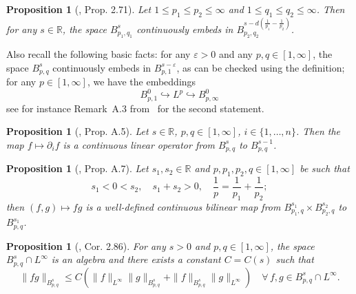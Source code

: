 \documentclass[11pt,oneside,reqno]{amsart}
\newtheorem{proposition}[theorem]{Proposition}
{\theoremstyle{remark}\newtheorem{remark}[theorem]{Remark}}
\numberwithin{equation}{section}
\begin{document}
\begin{proposition}[{\cite{bahouri}}, Prop. 2.71]
  \label{prop:besov-embeddings}Let $1 \leqslant p_1 \leqslant p_2 \leqslant
  \infty$ and $1 \leqslant q_1 \leqslant q_2 \leqslant \infty$. Then for any
  $s \in \mathbb{R}$, the space $B^s_{p_1, q_1}$ continuously embeds in $B^{s
  - d \left( \frac{1}{p_1} - \frac{1}{p_2} \right)}_{p_2, q_2}$.
\end{proposition}

Also recall the following basic facts: for any $\varepsilon > 0$ and any $p, q
\in [1, \infty]$, the space $B^s_{p, q}$ continuously embeds in $B^{s -
\varepsilon}_{p, 1}$, as can be checked using the definition; for any $p \in
[1, \infty]$, we have the embeddings
\[ B^{0}_{p, 1} \hookrightarrow L^p \hookrightarrow
   B^{0}_{p, \infty} \]
see for instance Remark~A.3 from~{\cite{mourrat}} for the second statement.

\begin{proposition}[{\cite{mourrat}}, Prop. A.5]
  \label{prop:besov-differentiation}Let $s \in \mathbb{R}$, $p, q \in [1,
  \infty]$, $i \in \{ 1, \ldots, n \}$. Then the map $f \mapsto \partial_i f$
  is a continuous linear operator from $B^s_{p, q}$ to $B^{s - 1}_{p, q}$.
\end{proposition}

\begin{proposition}[{\cite{mourrat}}, Prop. A.7]
  \label{prop:besov-paraproducts}Let $s_1, s_2 \in \mathbb{R}$ and $p, p_1,
  p_2, q \in [1, \infty]$ be such that
  \[ s_1 < 0 < s_2, \quad s_1 + s_2 > 0, \quad \frac{1}{p} = \frac{1}{p_1} +
     \frac{1}{p_2} ; \]
  then $(f, g) \mapsto f g$ is a well-defined continuous bilinear map from
  $B^{s_1}_{p_1, q} \times B^{s_2}_{p_2, q}$ to $B^{s_1}_{p, q}$.
\end{proposition}

\begin{proposition}[{\cite{bahouri}}, Cor. 2.86]
  \label{prop:besov-algebra}For any $s > 0$ and $p, q \in [1, \infty]$, the
  space $B^s_{p, q} \cap L^{\infty}$ is an algebra and there exists a constant
  $C = C (s)$ such that
  \[ \| f g \|_{B^s_{p, q}} \leqslant C (\| f \|_{L^{\infty}} \| g \|_{B^s_{p,
     q}} + \| f \|_{B^s_{p, q}} \| g \|_{L^{\infty}}) \quad \forall \, f, g
     \in B^s_{p, q} \cap L^{\infty} . \]
\end{proposition}
\end{document}
